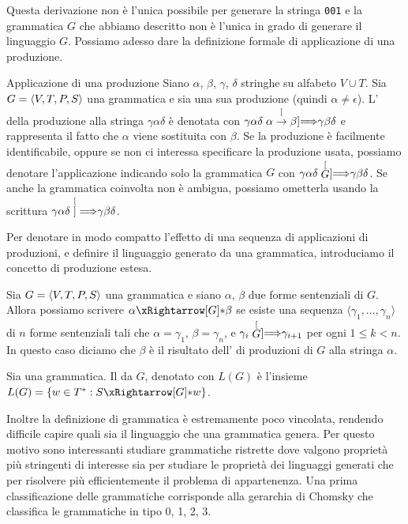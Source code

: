 Questa derivazione non è l'unica possibile per generare la stringa \texttt{001} e la grammatica $G$ che abbiamo
descritto non è l'unica in grado di generare il linguaggio $G$.
Possiamo adesso dare la definizione formale di applicazione di una produzione.

\begin{definition}Applicazione di una produzione\label{def:applicazione-produzione}
Siano $\alpha$, $\beta$, $\gamma$, $\delta$ stringhe su alfabeto $V\cup T$.
Sia $G=\langle V, T, P, S \rangle$ una grammatica e sia \prodgen una sua produzione (quindi $\alpha\neq\epsilon$).
L' della produzione \prodgen alla stringa $\gamma\alpha\delta$ è denotata con
$\gamma\alpha\delta \stackrel[{\alpha\to\beta}]{}{\Longrightarrow} \gamma\beta\delta$ e rappresenta il fatto che $\alpha$ viene sostituita con $\beta$.
Se la produzione \prodgen è facilmente identificabile, oppure se non ci interessa specificare la produzione usata, possiamo denotare l'applicazione indicando solo la grammatica $G$
con $\gamma\alpha\delta \stackrel[G]{}{\Longrightarrow} \gamma\beta\delta$.
Se anche la grammatica coinvolta non è ambigua, possiamo ometterla usando la scrittura $\gamma\alpha\delta \stackrel[]{}{\Longrightarrow} \gamma\beta\delta$.
\end{definition}

Per denotare in modo compatto l'effetto di una sequenza di applicazioni di produzioni, e definire il linguaggio generato
da una grammatica, introduciamo il concetto di
produzione estesa.

\begin{definition}\label{def:applicazione-produzione-estesa}
Sia $G=\langle V, T, P, S \rangle$ una grammatica e siano $\alpha$, $\beta$ due forme sentenziali di $G$.
Allora possiamo scrivere $\alpha \eprod{G} \beta$ se esiste una sequenza
$\langle \gamma_{1}, \ldots, \gamma_{n}\rangle $ di $n$ forme sentenziali tali che $\alpha = \gamma_{1}$,
$\beta = \gamma_{n}$, e $\gamma_{i} \stackrel[G]{}{\Longrightarrow} \gamma_{i+1}$ per ogni $1\le k< n$.
In questo caso diciamo che $\beta$ è il risultato dell' di produzioni di $G$ alla stringa $\alpha$.
\end{definition}


\begin{definition}\label{def:linguaggio-generato}
Sia \gramm una grammatica.
Il  da $G$, denotato con $L(G)$ è l'insieme $L(G)= \{ w\in T^{*}: S \eprod{G} w\}$.
\end{definition}

Inoltre la definizione di grammatica è estremamente poco vincolata, rendendo difficile capire quali sia il linguaggio
che una grammatica genera. Per questo motivo sono interessanti studiare grammatiche ristrette dove valgono proprietà più
stringenti di interesse sia per studiare le proprietà dei linguaggi generati che per risolvere più efficientemente il
problema di appartenenza.
Una prima classificazione delle grammatiche corrisponde alla gerarchia di Chomsky che classifica le grammatiche in tipo
0, 1, 2, 3.

